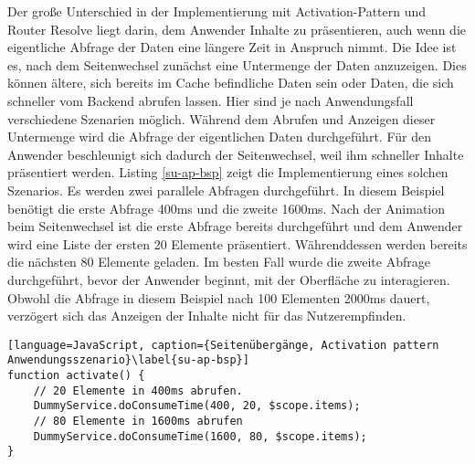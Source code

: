 Der große Unterschied in der Implementierung mit Activation-Pattern und Router Resolve liegt darin, dem Anwender Inhalte zu präsentieren, auch wenn die eigentliche Abfrage der Daten eine längere Zeit in Anspruch nimmt. Die Idee ist es, nach dem Seitenwechsel zunächst eine Untermenge der Daten anzuzeigen. Dies können ältere, sich  bereits im Cache befindliche Daten sein oder Daten, die sich schneller vom Backend abrufen lassen. Hier sind je nach Anwendungsfall verschiedene Szenarien möglich. Während dem Abrufen und Anzeigen dieser Untermenge wird die Abfrage der eigentlichen Daten durchgeführt. Für den Anwender beschleunigt sich dadurch der Seitenwechsel, weil ihm schneller Inhalte präsentiert werden. Listing \ref{su-ap-bsp} zeigt die Implementierung eines solchen Szenarios. Es werden zwei parallele Abfragen durchgeführt. In diesem Beispiel benötigt die erste Abfrage 400ms und die zweite 1600ms. Nach der Animation beim Seitenwechsel ist die erste Abfrage bereits durchgeführt und dem Anwender wird eine Liste der ersten 20 Elemente präsentiert. Währenddessen werden bereits die nächsten 80 Elemente geladen. Im besten Fall wurde die zweite Abfrage durchgeführt, bevor der Anwender beginnt, mit der Oberfläche zu interagieren. Obwohl die Abfrage in diesem Beispiel nach 100 Elementen 2000ms dauert, verzögert sich das Anzeigen der Inhalte nicht für das Nutzerempfinden.
\begin{lstlisting}[language=JavaScript, caption={Seitenübergänge, Activation pattern Anwendungsszenario}\label{su-ap-bsp}]
function activate() {
	// 20 Elemente in 400ms abrufen.
	DummyService.doConsumeTime(400, 20, $scope.items);
	// 80 Elemente in 1600ms abrufen
	DummyService.doConsumeTime(1600, 80, $scope.items);
}
\end{lstlisting}

